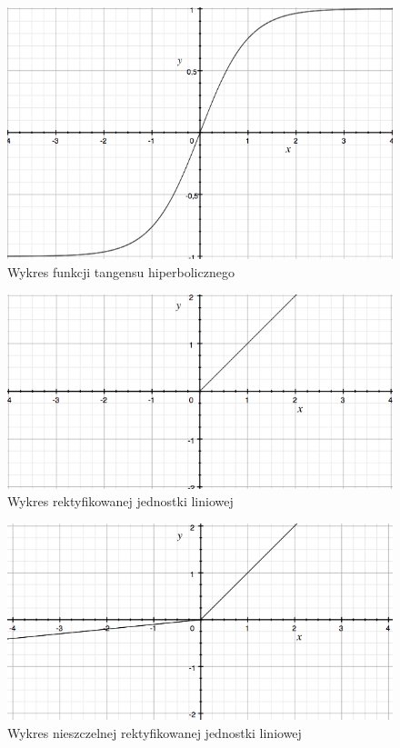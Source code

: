 \documentclass[12pt,a4paper,twoside,titlepage,openright]{book}
\begin{document}
\begin{itemize}
\begin{figure}[ht]
	\centering
			\includegraphics[resolution=100, scale=0.7]{Tangens.png}
		\caption{Wykres funkcji tangensu hiperbolicznego}
\end{figure}

\begin{figure}[ht]
	\centering
			\includegraphics[resolution=100, scale=0.8]{ReLU.png}
		\caption{Wykres rektyfikowanej jednostki liniowej}
\end{figure}

\begin{figure}[ht]
	\centering
			\includegraphics[resolution=100, scale=0.8]{leakyReLU.png}
		\caption{Wykres nieszczelnej rektyfikowanej jednostki liniowej}
\end{figure}


\end{itemize}
\end{document}
